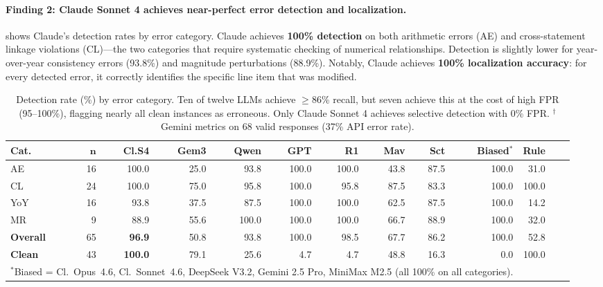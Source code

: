 \documentclass[11pt]{article}
\begin{document}
\paragraph{Finding 2: Claude Sonnet 4 achieves near-perfect error detection and localization.}
 shows Claude's detection rates by error category.
Claude achieves \textbf{100\% detection} on both arithmetic errors (AE) and cross-statement linkage violations (CL)---the two categories that require systematic checking of numerical relationships.
Detection is slightly lower for year-over-year consistency errors (93.8\%) and magnitude perturbations (88.9\%).
Notably, Claude achieves \textbf{100\% localization accuracy}: for every detected error, it correctly identifies the specific line item that was modified.

\begin{table}[t]
\centering
\footnotesize
\caption{Detection rate (\%) by error category.
Ten of twelve LLMs achieve $\geq$86\% recall, but seven achieve this at the cost of high FPR (95--100\%), flagging nearly all clean instances as erroneous.
Only Claude Sonnet 4 achieves selective detection with 0\% FPR.
$^\dagger$Gemini metrics on 68 valid responses (37\% API error rate).
}
\label{tab:category_results}
\begin{tabular}{lrrrrrrrrrrrr}
\toprule
\textbf{Cat.} & $\bm{n}$ & \textbf{Cl.S4} & \textbf{Gem3} & \textbf{Qwen} & \textbf{GPT} & \textbf{R1} & \textbf{Mav} & \textbf{Sct} & \textbf{Biased$^*$} & \textbf{Rule} \\
\midrule
AE       & 16 & 100.0 & 25.0 & 93.8 & 100.0 & 100.0 & 43.8 & 87.5 & 100.0 & 31.0 \\
CL  & 24 & 100.0 & 75.0 & 95.8 & 100.0 & 95.8 & 87.5 & 83.3 & 100.0 & 100.0 \\
YoY  & 16 & 93.8 & 37.5 & 87.5 & 100.0 & 100.0 & 62.5 & 87.5 & 100.0 & 14.2 \\
MR        &  9 & 88.9 & 55.6 & 100.0 & 100.0 & 100.0 & 66.7 & 88.9 & 100.0 & 32.0 \\
\midrule
\textbf{Overall}      & 65 & \textbf{96.9} & 50.8 & 93.8 & 100.0 & 98.5 & 67.7 & 86.2 & 100.0 & 52.8 \\
\midrule
\textbf{Clean}  & 43 & \textbf{100.0} & 79.1 & 25.6 & 4.7 & 4.7 & 48.8 & 16.3 & 0.0 & 100.0 \\
\bottomrule
\multicolumn{10}{l}{\scriptsize $^*$Biased = Cl.~Opus~4.6, Cl.~Sonnet~4.6, DeepSeek V3.2, Gemini 2.5 Pro, MiniMax M2.5 (all 100\% on all categories).}
\end{tabular}
\end{table}
\end{document}

